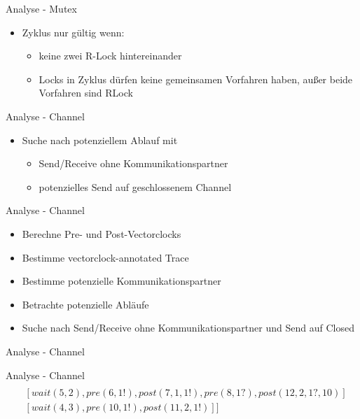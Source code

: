 \documentclass[aspectratio=169]{beamer}  %
\begin{document}
\begin{frame}{Analyse - Mutex}
  \begin{itemize}
    \item Zyklus nur gültig wenn:
    \begin{itemize}
      \item keine zwei R-Lock hintereinander
      \item Locks in Zyklus dürfen keine gemeinsamen Vorfahren haben, außer beide 
        Vorfahren sind RLock
    \end{itemize}
  \end{itemize}
\end{frame}

\begin{frame}{Analyse - Channel}
  \begin{itemize}
    \item Suche nach potenziellem Ablauf mit 
    \begin{itemize}
      \item Send/Receive ohne Kommunikationspartner
      \item potenzielles Send auf geschlossenem Channel
    \end{itemize} 
  \end{itemize}
\end{frame}

\begin{frame}{Analyse - Channel}
  \begin{itemize}
    \item Berechne Pre- und Post-Vectorclocks
    \item Bestimme vectorclock-annotated Trace
    \item Bestimme potenzielle Kommunikationspartner
    \item Betrachte potenzielle Abläufe 
    \item Suche nach Send/Receive ohne Kommunikationspartner und Send auf Closed
  \end{itemize}
\end{frame}

\begin{frame}{Analyse - Channel}
    
\end{frame}

\begin{frame}{Analyse - Channel}
  \begin{align*}
    [&[signal(1, 2), signal(2, 3), pre(3, 1?), post(9, 1, 1?, 6)]\\
    &[wait(5, 2), pre(6, 1!), post(7, 1, 1!), pre(8, 1?), post(12, 2, 1?, 10)]\\
    &[wait(4, 3), pre(10, 1!), post(11, 2, 1!)]]
  \end{align*}
\end{frame}
\end{document}
